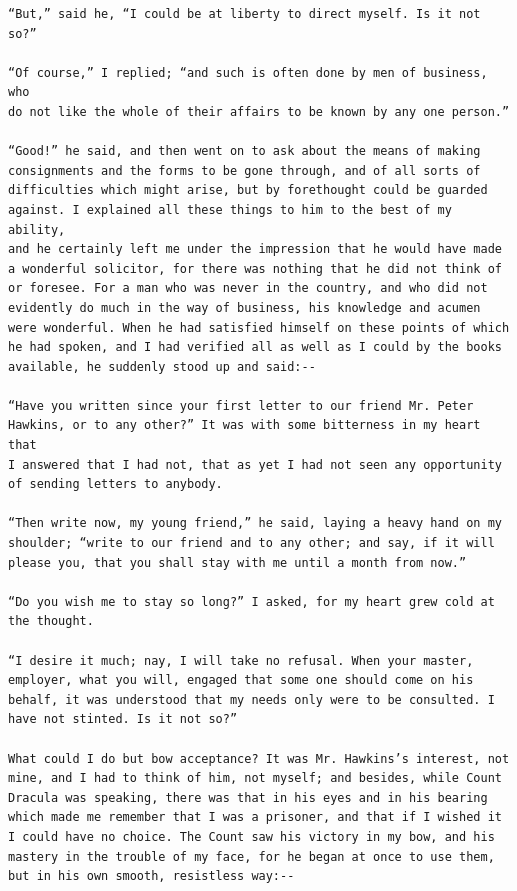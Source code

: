 \documentclass{article}
\begin{document}
\begin{verbatim}
“But,” said he, “I could be at liberty to direct myself. Is it not so?”

“Of course,” I replied; “and such is often done by men of business, who
do not like the whole of their affairs to be known by any one person.”

“Good!” he said, and then went on to ask about the means of making
consignments and the forms to be gone through, and of all sorts of
difficulties which might arise, but by forethought could be guarded
against. I explained all these things to him to the best of my ability,
and he certainly left me under the impression that he would have made
a wonderful solicitor, for there was nothing that he did not think of
or foresee. For a man who was never in the country, and who did not
evidently do much in the way of business, his knowledge and acumen
were wonderful. When he had satisfied himself on these points of which
he had spoken, and I had verified all as well as I could by the books
available, he suddenly stood up and said:--

“Have you written since your first letter to our friend Mr. Peter
Hawkins, or to any other?” It was with some bitterness in my heart that
I answered that I had not, that as yet I had not seen any opportunity
of sending letters to anybody.

“Then write now, my young friend,” he said, laying a heavy hand on my
shoulder; “write to our friend and to any other; and say, if it will
please you, that you shall stay with me until a month from now.”

“Do you wish me to stay so long?” I asked, for my heart grew cold at
the thought.

“I desire it much; nay, I will take no refusal. When your master,
employer, what you will, engaged that some one should come on his
behalf, it was understood that my needs only were to be consulted. I
have not stinted. Is it not so?”

What could I do but bow acceptance? It was Mr. Hawkins’s interest, not
mine, and I had to think of him, not myself; and besides, while Count
Dracula was speaking, there was that in his eyes and in his bearing
which made me remember that I was a prisoner, and that if I wished it
I could have no choice. The Count saw his victory in my bow, and his
mastery in the trouble of my face, for he began at once to use them,
but in his own smooth, resistless way:--


\end{verbatim}
\end{document}
